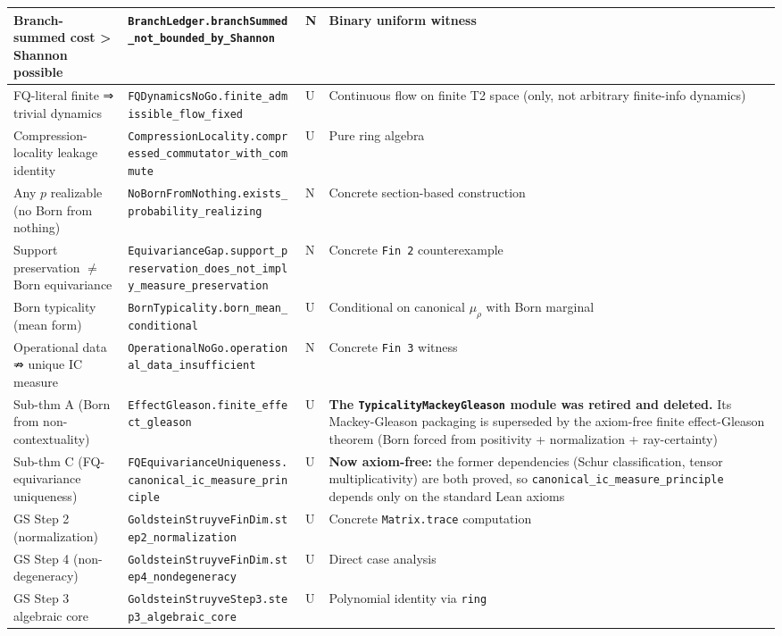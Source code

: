 \documentclass[11pt,a4paper]{article}
\begin{document}
\begin{center}
\begin{tabularx}{\linewidth}{|Y|Y|Y|Y|}
\hline
Branch-summed cost > Shannon possible & \texttt{BranchLedger.branchSummed\_not\_bounded\_by\_Shannon} & N & Binary uniform witness \\
\hline
FQ-literal finite ⇒ trivial dynamics & \texttt{FQDynamicsNoGo.finite\_admissible\_flow\_fixed} & U & Continuous flow on finite T2 space (only, not arbitrary finite-info dynamics) \\
\hline
Compression-locality leakage identity & \texttt{CompressionLocality.compressed\_commutator\_with\_commute} & U & Pure ring algebra \\
\hline
Any $p$ realizable (no Born from nothing) & \texttt{NoBornFromNothing.exists\_probability\_realizing} & N & Concrete section-based construction \\
\hline
Support preservation $\neq$ Born equivariance & \texttt{EquivarianceGap.support\_preservation\_does\_not\_imply\_measure\_preservation} & N & Concrete \texttt{Fin 2} counterexample \\
\hline
Born typicality (mean form) & \texttt{BornTypicality.born\_mean\_conditional} & U & Conditional on canonical $\mu_\rho$ with Born marginal \\
\hline
Operational data ⇏ unique IC measure & \texttt{OperationalNoGo.operational\_data\_insufficient} & N & Concrete \texttt{Fin 3} witness \\
\hline
Sub-thm A (Born from non-contextuality) & \texttt{EffectGleason.finite\_effect\_gleason} & U & \textbf{The \texttt{TypicalityMackeyGleason} module was retired and deleted.} Its Mackey-Gleason packaging is superseded by the axiom-free finite effect-Gleason theorem (Born forced from positivity + normalization + ray-certainty) \\
\hline
Sub-thm C (FQ-equivariance uniqueness) & \texttt{FQEquivarianceUniqueness.canonical\_ic\_measure\_principle} & U & \textbf{Now axiom-free:} the former dependencies (Schur classification, tensor multiplicativity) are both proved, so \texttt{canonical\_ic\_measure\_principle} depends only on the standard Lean axioms \\
\hline
GS Step 2 (normalization) & \texttt{GoldsteinStruyveFinDim.step2\_normalization} & U & Concrete \texttt{Matrix.trace} computation \\
\hline
GS Step 4 (non-degeneracy) & \texttt{GoldsteinStruyveFinDim.step4\_nondegeneracy} & U & Direct case analysis \\
\hline
GS Step 3 algebraic core & \texttt{GoldsteinStruyveStep3.step3\_algebraic\_core} & U & Polynomial identity via \texttt{ring} \\

\end{tabularx}
\end{center}
\end{document}
